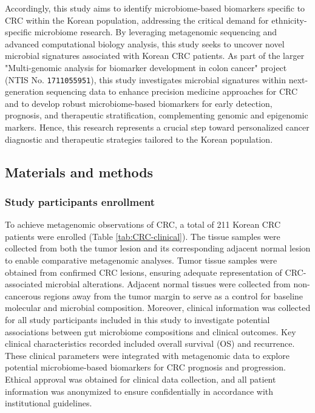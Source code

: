 \documentclass[11pt, a4paper, onecolumn, oneside]{report}
\begin{document}
            Accordingly, this study aims to identify microbiome-based biomarkers specific to CRC within the Korean population, addressing the critical demand for ethnicity-specific microbiome research. By leveraging metagenomic sequencing and advanced computational biology analysis, this study seeks to uncover novel microbial signatures associated with Korean CRC patients. As part of the larger "Multi-genomic analysis for biomarker development in colon cancer" project (NTIS No. \texttt{1711055951}), this study investigates microbial signatures within next-generation sequencing data to enhance precision medicine approaches for CRC and to develop robust microbiome-based biomarkers for early detection, prognosis, and therapeutic stratification, complementing genomic and epigenomic markers. Hence, this research represents a crucial step toward personalized cancer diagnostic and therapeutic strategies tailored to the Korean population.
        \clearpage

        \subsection{Materials and methods}
            \subsubsection{Study participants enrollment}
                To achieve metagenomic observations of CRC, a total of 211 Korean CRC patients were enrolled (Table \ref{tab:CRC-clinical}). The tissue samples were collected from both the tumor lesion and its corresponding adjacent normal lesion to enable comparative metagenomic analyses. Tumor tissue samples were obtained from confirmed CRC lesions, ensuring adequate representation of CRC-associated microbial alterations. Adjacent normal tissues were collected from non-cancerous regions away from the tumor margin to serve as a control for baseline molecular and microbial composition. Moreover, clinical information was collected for all study participants included in this study to investigate potential associations between gut microbiome compositions and clinical outcomes. Key clinical characteristics recorded included overall survival (OS) and recurrence. These clinical parameters were integrated with metagenomic data to explore potential microbiome-based biomarkers for CRC prognosis and progression. Ethical approval was obtained for clinical data collection, and all patient information was anonymized to ensure confidentially in accordance with institutional guidelines.
\end{document}
